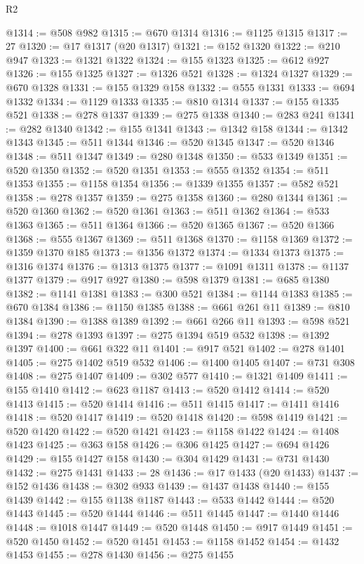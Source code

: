 \begin{lexlean}{R2}
\begin{coremodule}
@1314 := @508 @982
@1315 := @670 @1314
@1316 := @1125 @1315
@1317 := 27
@1320 := @17 @1317 (@20 @1317)
@1321 := @152 @1320
@1322 := @210 @947
@1323 := @1321 @1322
@1324 := @155 @1323
@1325 := @612 @927
@1326 := @155 @1325
@1327 := @1326 @521
@1328 := @1324 @1327
@1329 := @670 @1328
@1331 := @155 @1329 @158
@1332 := @555 @1331
@1333 := @694 @1332
@1334 := @1129 @1333
@1335 := @810 @1314
@1337 := @155 @1335 @521
@1338 := @278 @1337
@1339 := @275 @1338
@1340 := @283 @241
@1341 := @282 @1340
@1342 := @155 @1341
@1343 := @1342 @158
@1344 := @1342 @1343
@1345 := @511 @1344
@1346 := @520 @1345
@1347 := @520 @1346
@1348 := @511 @1347
@1349 := @280 @1348
@1350 := @533 @1349
@1351 := @520 @1350
@1352 := @520 @1351
@1353 := @555 @1352
@1354 := @511 @1353
@1355 := @1158 @1354
@1356 := @1339 @1355
@1357 := @582 @521
@1358 := @278 @1357
@1359 := @275 @1358
@1360 := @280 @1344
@1361 := @520 @1360
@1362 := @520 @1361
@1363 := @511 @1362
@1364 := @533 @1363
@1365 := @511 @1364
@1366 := @520 @1365
@1367 := @520 @1366
@1368 := @555 @1367
@1369 := @511 @1368
@1370 := @1158 @1369
@1372 := @1359 @1370 @185
@1373 := @1356 @1372
@1374 := @1334 @1373
@1375 := @1316 @1374
@1376 := @1313 @1375
@1377 := @1091 @1311
@1378 := @1137 @1377
@1379 := @917 @927
@1380 := @598 @1379
@1381 := @685 @1380
@1382 := @1141 @1381
@1383 := @300 @521
@1384 := @1144 @1383
@1385 := @670 @1384
@1386 := @1150 @1385
@1388 := @661 @261 @11
@1389 := @810 @1384
@1390 := @1388 @1389
@1392 := @661 @266 @11
@1393 := @598 @521
@1394 := @278 @1393
@1397 := @275 @1394 @519 @532
@1398 := @1392 @1397
@1400 := @661 @322 @11
@1401 := @917 @521
@1402 := @278 @1401
@1405 := @275 @1402 @519 @532
@1406 := @1400 @1405
@1407 := @731 @308
@1408 := @275 @1407
@1409 := @302 @577
@1410 := @1321 @1409
@1411 := @155 @1410
@1412 := @623 @1187
@1413 := @520 @1412
@1414 := @520 @1413
@1415 := @520 @1414
@1416 := @511 @1415
@1417 := @1411 @1416
@1418 := @520 @1417
@1419 := @520 @1418
@1420 := @598 @1419
@1421 := @520 @1420
@1422 := @520 @1421
@1423 := @1158 @1422
@1424 := @1408 @1423
@1425 := @363 @158
@1426 := @306 @1425
@1427 := @694 @1426
@1429 := @155 @1427 @158
@1430 := @304 @1429
@1431 := @731 @1430
@1432 := @275 @1431
@1433 := 28
@1436 := @17 @1433 (@20 @1433)
@1437 := @152 @1436
@1438 := @302 @933
@1439 := @1437 @1438
@1440 := @155 @1439
@1442 := @155 @1138 @1187
@1443 := @533 @1442
@1444 := @520 @1443
@1445 := @520 @1444
@1446 := @511 @1445
@1447 := @1440 @1446
@1448 := @1018 @1447
@1449 := @520 @1448
@1450 := @917 @1449
@1451 := @520 @1450
@1452 := @520 @1451
@1453 := @1158 @1452
@1454 := @1432 @1453
@1455 := @278 @1430
@1456 := @275 @1455

\end{coremodule}
\end{lexlean}
